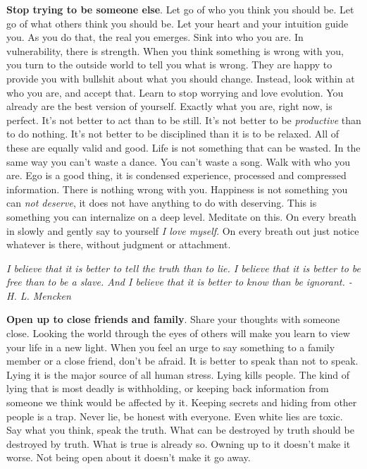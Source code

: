 \documentclass[a4paper,hidelinks]{article}
\begin{document}
\textbf{Stop trying to be someone else}.
Let go of who you think you should be.
Let go of what others think you should be.
Let your heart and your intuition guide you.
As you do that, the real you emerges.
Sink into who you are.
In vulnerability, there is strength.
When you think something is wrong with you, you turn to the outside world to tell you what is wrong.
They are happy to provide you with bullshit about what you should change.
Instead, look within at who you are, and accept that.
Learn to stop worrying and love evolution.
You already are the best version of yourself.
Exactly what you are, right now, is perfect.
It's not better to act than to be still.
It's not better to be \textit{productive} than to do nothing.
It's not better to be disciplined than it is to be relaxed.
All of these are equally valid and good.
Life is not something that can be wasted.
In the same way you can't waste a dance.
You can't waste a song.
Walk with who you are.
Ego is a good thing, it is condensed experience, processed and compressed information.
There is nothing wrong with you.
Happiness is not something you can \textit{not deserve}, it does not have anything to do with deserving.
This is something you can internalize on a deep level.
Meditate on this.
On every breath in slowly and gently say to yourself \textit{I love myself}.
On every breath out just notice whatever is there, without judgment or attachment.

\newpage

\begin{center}
\textit{I believe that it is better to tell the truth than to lie. I believe that it is better to be free than to be a slave. And I believe that it is better to know than be ignorant. - H. L. Mencken}
\end{center}

\textbf{Open up to close friends and family}.
Share your thoughts with someone close.
Looking the world through the eyes of others will make you learn to view your life in a new light.
When you feel an urge to say something to a family member or a close friend, don't be afraid.
It is better to speak than not to speak.
Lying it is the major source of all human stress.
Lying kills people.
The kind of lying that is most deadly is withholding, or keeping back information from someone we think would be affected by it.
Keeping secrets and hiding from other people is a trap.
Never lie, be honest with everyone.
Even white lies are toxic.
Say what you think, speak the truth.
What can be destroyed by truth should be destroyed by truth.
What is true is already so.
Owning up to it doesn't make it worse.
Not being open about it doesn't make it go away.
\end{document}
